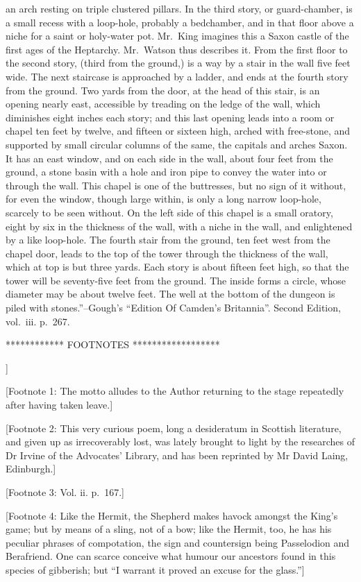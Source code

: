 an arch resting on triple clustered pillars. In the third story, or
guard-chamber, is a small recess with a loop-hole, probably a
bedchamber, and in that floor above a niche for a saint or holy-water
pot. Mr.~King imagines this a Saxon castle of the first ages of the
Heptarchy. Mr.~Watson thus describes it. From the first floor to the
second story, (third from the ground,) is a way by a stair in the wall
five feet wide. The next staircase is approached by a ladder, and ends
at the fourth story from the ground. Two yards from the door, at the
head of this stair, is an opening nearly east, accessible by treading on
the ledge of the wall, which diminishes eight inches each story; and
this last opening leads into a room or chapel ten feet by twelve, and
fifteen or sixteen high, arched with free-stone, and supported by small
circular columns of the same, the capitals and arches Saxon. It has an
east window, and on each side in the wall, about four feet from the
ground, a stone basin with a hole and iron pipe to convey the water into
or through the wall. This chapel is one of the buttresses, but no sign
of it without, for even the window, though large within, is only a long
narrow loop-hole, scarcely to be seen without. On the left side of this
chapel is a small oratory, eight by six in the thickness of the wall,
with a niche in the wall, and enlightened by a like loop-hole. The
fourth stair from the ground, ten feet west from the chapel door, leads
to the top of the tower through the thickness of the wall, which at top
is but three yards. Each story is about fifteen feet high, so that the
tower will be seventy-five feet from the ground. The inside forms a
circle, whose diameter may be about twelve feet. The well at the bottom
of the dungeon is piled with stones.''--Gough's ``Edition Of Camden's
Britannia''. Second Edition, vol.~iii. p.~267.

************ FOOTNOTES ******************

{]}

{[}Footnote 1: The motto alludes to the Author returning to the stage
repeatedly after having taken leave.{]}

{[}Footnote 2: This very curious poem, long a desideratum in Scottish
literature, and given up as irrecoverably lost, was lately brought to
light by the researches of Dr Irvine of the Advocates' Library, and has
been reprinted by Mr David Laing, Edinburgh.{]}

{[}Footnote 3: Vol. ii. p.~167.{]}

{[}Footnote 4: Like the Hermit, the Shepherd makes havock amongst the
King's game; but by means of a sling, not of a bow; like the Hermit,
too, he has his peculiar phrases of compotation, the sign and
countersign being Passelodion and Berafriend. One can scarce conceive
what humour our ancestors found in this species of gibberish; but ``I
warrant it proved an excuse for the glass.''{]}

